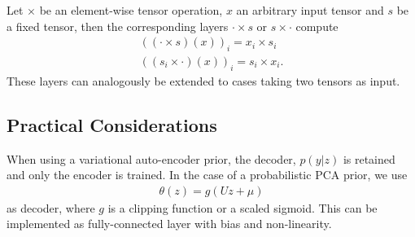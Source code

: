 \begin{definition}
  Let $\times$ be an element-wise tensor operation,
  $x$ an arbitrary input tensor and $s$ be a fixed tensor, then
  the corresponding layers $\cdot \times s$ or $s \times \cdot$
  compute
  \begin{align}
    ((\cdot \times s)(x))_i = x_i \times s_i\\
    ((s_i \times \cdot)(x))_i = s_i \times x_i.
  \end{align}
  These layers can analogously be extended to cases
  taking two tensors as input.
\end{definition}

\subsection{Practical Considerations}

When using a variational auto-encoder prior, the decoder, \ie $p(y|z)$ is
retained and only the encoder is trained. In the case of a
probabilistic PCA prior, we use
\begin{align}
  \theta(z) = g(Uz + \mu)
\end{align}
as decoder, where $g$ is a clipping function or a scaled sigmoid.
This can be implemented as fully-connected layer with bias and non-linearity.
